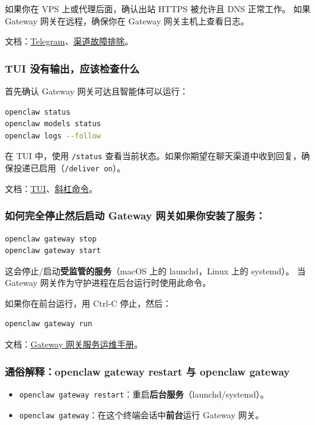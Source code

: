 如果你在 VPS 上或代理后面，确认出站 HTTPS 被允许且 DNS 正常工作。
如果 Gateway 网关在远程，确保你在 Gateway 网关主机上查看日志。

文档：\href{/channels/telegram}{Telegram}、\href{/channels/troubleshooting}{渠道故障排除}。

\subsubsection{TUI 没有输出，应该检查什么}


首先确认 Gateway 网关可达且智能体可以运行：

\begin{lstlisting}[language=bash]
openclaw status
openclaw models status
openclaw logs --follow
\end{lstlisting}


在 TUI 中，使用 \texttt{/status} 查看当前状态。如果你期望在聊天渠道中收到回复，确保投递已启用（\texttt{/deliver on}）。

文档：\href{/web/tui}{TUI}、\href{/tools/slash-commands}{斜杠命令}。

\subsubsection{如何完全停止然后启动 Gateway 网关如果你安装了服务：}


\begin{lstlisting}[language=bash]
openclaw gateway stop
openclaw gateway start
\end{lstlisting}


这会停止/启动\textbf{受监管的服务}（macOS 上的 launchd，Linux 上的 systemd）。
当 Gateway 网关作为守护进程在后台运行时使用此命令。

如果你在前台运行，用 Ctrl‑C 停止，然后：

\begin{lstlisting}[language=bash]
openclaw gateway run
\end{lstlisting}


文档：\href{/gateway}{Gateway 网关服务运维手册}。

\subsubsection{通俗解释：openclaw gateway restart 与 openclaw gateway}


\begin{itemize}
  \item \texttt{openclaw gateway restart}：重启\textbf{后台服务}（launchd/systemd）。
  \item \texttt{openclaw gateway}：在这个终端会话中\textbf{前台}运行 Gateway 网关。
\end{itemize}


